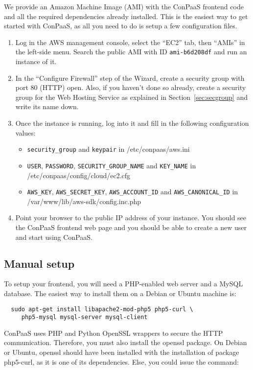 \documentclass[10pt]{article}
\begin{document}
We provide an Amazon Machine Image (AMI) with the ConPaaS frontend code and all
the required dependencies already installed. This is the easiest way to get
started with ConPaaS, as all you need to do is setup a few configuration
files.

\begin{enumerate}
\item Log in the AWS management console, select the ``EC2'' tab, then ``AMIs''
  in the left-side menu. Search the public AMI with ID \verb+ami-b6d208df+ and
  run an instance of it.
\item In the ``Configure Firewall'' step of the Wizard, create a security group
  with port 80 (HTTP) open. Also, if you haven't done so already, create a
  security group for the Web Hosting Service as explained in
  Section~\ref{sec:secgroup} and write its name down.
\item Once the instance is running, log into it and fill in the following
  configuration values:
  \begin{itemize}
  \item \verb+security_group+ and \verb|keypair| in /etc/conpaas/aws.ini
  \item \verb+USER+, \verb+PASSWORD+, \verb+SECURITY_GROUP_NAME+ and
  \verb+KEY_NAME+ in /etc/conpaas/config/cloud/ec2.cfg
  \item \verb+AWS_KEY+, \verb+AWS_SECRET_KEY+, \verb+AWS_ACCOUNT_ID+ and
  \verb+AWS_CANONICAL_ID+ in /var/www/lib/aws-sdk/config.inc.php
  \end{itemize}
\item Point your browser to the public IP address of your instance. You should
  see the ConPaaS frontend web page and you should be able to create a new user
  and start using ConPaaS.
\end{enumerate}

\subsection{Manual setup}
\label{sec:frontend-manual}
To setup your frontend, you will need a PHP-enabled web server and a
MySQL database. The easiest way to install them on a Debian or Ubuntu
machine is:

\begin{verbatim}
  sudo apt-get install libapache2-mod-php5 php5-curl \
     php5-mysql mysql-server mysql-client
\end{verbatim}

ConPaaS uses PHP and Python OpenSSL wrappers to secure the HTTP communication.
Therefore, you must also install the openssl package. On Debian or Ubuntu,
openssl should have been installed with the installation of
package php5-curl, as it is one of its dependencies. Else, you could issue
the command:
\end{document}
